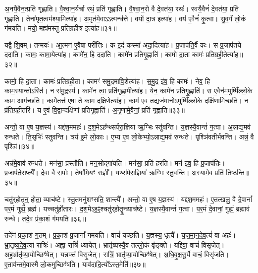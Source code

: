अ॒नयै॒वैन॒त्प्रति॑ गृह्णाति।
वै॒श्वा॒न॒र्यर्चा रथं॒ प्रति॑ गृह्णाति।
वै॒श्वा॒न॒रो वै दे॒वत॑या॒ रथः॑।
स्वयै॒वैनं॑ दे॒वत॑या॒ प्रति॑ गृह्णाति।
तेना॑मृत॒त्वम॑श्या॒मित्या॑ह।
अ॒मृत॑मे॒वाऽऽत्मन्ध॑त्ते।
वयो॑ दा॒त्र इत्या॑ह।
वय॑ ए॒वैनं॑ कृ॒त्वा।
सु॒व॒र्गं लो॒कं ग॑मयति।
मयो॒ मह्य॑मस्तु प्रतिग्रही॒त्र इत्या॑ह॥३१॥

यद्वै शि॒वम्।
तन्मयः॑।
आ॒त्मन॑ ए॒वैषा परी᳚त्तिः।
क इ॒दं कस्मा॑ अदा॒दित्या॑ह।
प्र॒जा\-प॑ति॒र्वै कः।
स प्र॒जा\-प॑तये ददाति।
कामः॒ कामा॒येत्या॑ह।
कामे॑न॒ हि ददा॑ति।
कामे॑न प्रतिगृ॒ह्णाति॑।
कामो॑ दा॒ता कामः॑ प्रतिग्रही॒तेत्या॑ह॥३२॥

कामो॒ हि दा॒ता।
कामः॑ प्रतिग्रही॒ता।
कामꣳ॑ समु॒द्रमावि॒शे\-त्या॑ह।
स॒मु॒द्र इ॑व॒ हि कामः॑।
नेव॒ हि काम॒स्यान्तो\-ऽस्ति॑।
न स॑मु॒द्रस्य॑।
कामे॑न त्वा॒ प्रति॑\-गृह्णा॒मीत्या॑ह।
येन॒ कामे॑न प्रतिगृ॒ह्णाति॑।
स ए॒वैन॑म॒मुष्मिँ॑ल्लो॒के काम॒ आग॑च्छति।
कामै॒तत्त॑ ए॒षा ते॑ काम॒ दक्षि॒णेत्या॑ह।
काम॑ ए॒व तद्यज॑मानो॒\-ऽमुष्मिँ॑ल्लो॒के दक्षि॑णामिच्छति।
न प्र॑तिग्रही॒तरि॑।
य ए॒वं वि॒द्वान्दक्षि॑णां प्रतिगृ॒ह्णाति॑।
अ॒नृ॒णामे॒वैनां॒ प्रति॑ गृह्णाति॥३३॥\anuvakamend[व्ली॒ना॒त्यश्व॒मित्या॑हाङ्गीर॒सः प्र॑तिग्रही॒त्र इत्या॑ह प्रतिग्रही॒तेत्या॑ह॒ दक्षि॒णेत्या॑ह च॒त्वारि॑ च]

अन्तो॒ वा ए॒ष य॒ज्ञस्य॑।
यद्द॑श॒ममहः॑।
द॒श॒मे\-ऽह᳚न्थ्सर्परा॒ज्ञिया॑ ऋ॒ग्भिः स्तु॑वन्ति।
य॒ज्ञस्यै॒वान्तं॑ ग॒त्वा।
अ॒न्नाद्य॒मव॑ रुन्धते।
ति॒सृभिः॑ स्तुवन्ति।
त्रय॑ इ॒मे लो॒काः।
ए॒भ्य ए॒व लो॒केभ्यो॒\-ऽन्नाद्य॒मव॑ रुन्धते।
पृश्ञि॑वतीर्भवन्ति।
अन्नं॒ वै पृश्ञि॑॥३४॥

अन्न॑मे॒वाव॑ रुन्धते।
मन॑सा॒ प्रस्तौ॑ति।
मन॒सोद्गा॑यति।
मन॑सा॒ प्रति॑ हरति।
मन॑ इव॒ हि प्र॒जा\-प॑तिः।
प्र॒जा\-प॑ते॒राप्त्यै᳚।
दे॒वा वै स॒र्पाः।
तेषा॑मि॒यꣳ राज्ञी᳚।
यथ्स॑र्परा॒ज्ञिया॑ ऋ॒ग्भिः स्तु॒वन्ति॑।
अ॒स्यामे॒व प्रति॑ तिष्ठन्ति॥३५॥

चतु॑र्‌\mbox{}होतॄ॒न्॒ होता॒ व्याच॑ष्टे।
स्तु॒तमनु॑शꣳसति॒ शान्त्यै᳚।
अन्तो॒ वा ए॒ष य॒ज्ञस्य॑।
यद्द॑श॒ममहः॑।
ए॒तत्खलु॒ वै दे॒वानां᳚ पर॒मं गुह्यं॒ ब्रह्म॑।
यच्चतु॑र्\mbox{}होतारः।
द॒श॒मे\-ऽह॒ꣴ॒श्चतु॑र्\-‌होतॄ॒न्व्याच॑ष्टे।
य॒ज्ञस्यै॒वान्तं॑ ग॒त्वा।
प॒र॒मं दे॒वानां॒ गुह्यं॒ ब्रह्माव॑ रुन्धे।
तदे॒व प्र॑का॒शं ग॑मयति॥३६॥

तदे॑नं प्रका॒शं ग॒तम्।
प्र॒का॒शं प्र॒जानां᳚ गमयति।
वाचं॑ यच्छति।
य॒ज्ञस्य॒ धृत्यै᳚।
य॒ज॒मा॒न॒दे॒व॒त्यं॑ वा अहः॑।
भ्रा॒तृ॒व्य॒दे॒व॒त्या॑ रात्रिः॑।
अह्ना॒ रात्रिं॑ ध्यायेत्।
भ्रातृ॑व्यस्यै॒व तल्लो॒कं वृ॑ङ्क्ते।
यद्दिवा॒ वाचं॑ विसृ॒जेत्।
अह॒र्भ्रातृ॑व्या॒योच्छिꣳ॑षेत्।
यन्नक्तं॑ विसृ॒जेत्।
रात्रिं॒ भ्रातृ॑व्या॒योच्छिꣳ॑षेत्।
अ॒धि॒वृ॒क्ष॒सू॒र्ये वाचं॒ विसृ॑जति।
ए॒ताव॑न्तमे॒वास्मै॑ लो॒कमुच्छिꣳ॑षति।
याव॑दादि॒त्यो᳚\-ऽस्त॒मेति॑॥३७॥\anuvakamend[पृश्ञि॑ तिष्ठन्ति गमयति शिꣳषे॒त्पञ्च॑ च]

